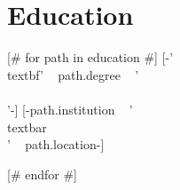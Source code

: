 \documentclass[a4paper,10pt]{article}
\begin{document}
\section*{Education}
[# for path in education #] 
    [-'\\textbf{' ~ path.degree ~ '} \\\\'-]
    [-path.institution ~ ' \\textbar\\ ' ~ path.location-]
\begin{itemize}
\end{itemize}
[# endfor #]
\end{document}
